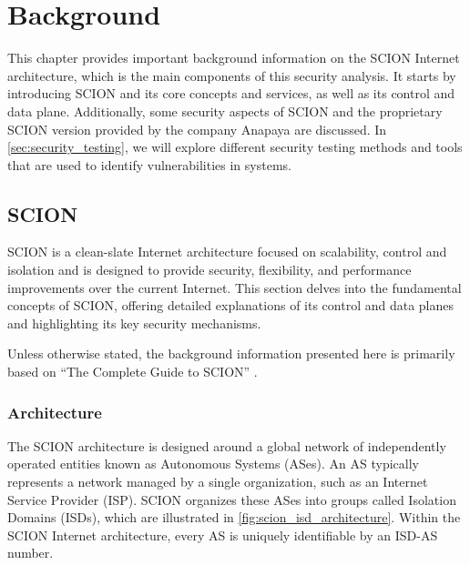\chapter{Background}
\label{ch:background}



This chapter provides important background information on the SCION Internet architecture, which is the main components of this security analysis.
It starts by introducing SCION and its core concepts and services, as well as its control and data plane.
Additionally, some security aspects of SCION and the proprietary SCION version provided by the company Anapaya are discussed.
In \cref{sec:security_testing}, we will explore different security testing methods and tools that are used to identify vulnerabilities in systems.


\section{SCION}

SCION \cite{Perrig2022} is a clean-slate Internet architecture focused on scalability, control and isolation and is designed to provide security, flexibility, and performance improvements over the current Internet.
This section delves into the fundamental concepts of SCION, offering detailed explanations of its control and data planes and highlighting its key security mechanisms.

Unless otherwise stated, the background information presented here is primarily based on  ``The Complete Guide to SCION'' \cite{Perrig2022}.

\subsection{Architecture}

The SCION architecture is designed around a global network of independently operated entities known as Autonomous Systems (ASes).
An AS typically represents a network managed by a single organization, such as an Internet Service Provider (ISP).
SCION organizes these ASes into groups called Isolation Domains (ISDs), which are illustrated in \cref{fig:scion_isd_architecture}.
Within the SCION Internet architecture, every AS is uniquely identifiable by an ISD-AS number.

